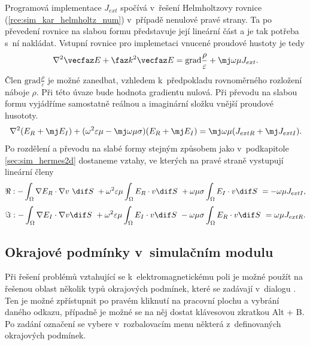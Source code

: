 Programová implementace $J_{ext}$ spočívá v~řešení Helmholtzovy rovnice (\ref{rce:sim_kar_helmholtz_num}) v~případě nenulové pravé strany. Ta po převedení rovnice na slabou formu představuje její lineární část a je tak potřeba s~ní nakládat. Vstupní rovnice pro implemetaci vnucené proudové hustoty je tedy
\begin{displaymath}
	\nabla^{2}\vecfaz E +\faz k^{2}\vecfaz E = \mathrm{grad}\frac{\rho}{\varepsilon} + \mj\omega\mu J_{ext}.
\end{displaymath}
Člen $\mathrm{grad}\frac{\rho}{\varepsilon}$ je možné zanedbat, vzhledem k~předpokladu rovnoměrného rozložení náboje $\rho$. Při této úvaze bude hodnota gradientu nulová. Při převodu na slabou formu vyjádříme samostatně reálnou a imaginární složku vnější proudové husototy.
\begin{displaymath}
	\nabla^{2}(E_R + \mj E_I) + (\omega^{2}\varepsilon\mu - \mj\omega\mu\sigma)(E_R + \mj E_I) = \mj\omega\mu (J_{ext R} + \mj J_{ext I}). 
\end{displaymath}
Po rozdělení a převodu na slabé formy stejným způsobem jako v~podkapitole \ref{sec:sim_hermes2d} dostaneme vztahy, ve kterých na pravé straně vystupují lineární členy 
\begin{equation}
	\Re : -\int_{\Omega}\nabla E_R\cdot\nabla v~\dif S~+ \omega^{2}\varepsilon\mu\int_{\Omega} E_R\cdot v\dif S~+ \omega\mu\sigma\int_{\Omega} E_I\cdot v\dif S~= -\omega\mu J_{ext I},
	\label{rce:sim_jext_real} 
\end{equation}
\begin{equation}
	\Im : -\int_{\Omega}\nabla E_I\cdot\nabla v\dif S~+ \omega^{2}\varepsilon\mu\int_{\Omega} E_I\cdot v\dif S~- \omega\mu\sigma\int_{\Omega} E_R\cdot v\dif S~= \omega\mu J_{ext R}.
	\label{rce:sim_jext_imag} 
\end{equation}










\subsection{Okrajové podmínky v~simulačním modulu}
Při řešení problémů vztahující se k~elektromagnetickému poli je možné použít na řešenou oblast několik typů okrajových podmínek, které se zadávají v~dialogu . Ten je možné zpřístupnit po pravém kliknutí na pracovní plochu a vybrání daného odkazu, případně je možné se na něj dostat klávesovou zkratkou Alt + B. Po zadání označení se vybere v~rozbalovacím menu některá z~definovaných okrajových podmínek.


